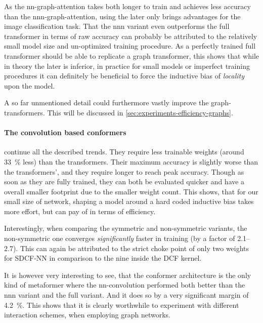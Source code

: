 As the nn-graph-attention takes both longer to train and achieves less accuracy than the nnn-graph-attention, using the later only brings advantages for the image classification task.
That the nnn variant even outperforms the full transformer in terms of raw accuracy can probably be attributed to the relatively small model size and un-optimized training procedure.
As a perfectly trained full transformer should be able to replicate a graph transformer, this shows that while in theory the later is inferior, in practice for small models or imperfect training procedures it can definitely be beneficial to force the inductive bias of \emph{locality} upon the model.

A so far unmentioned detail could furthermore vastly improve the graph-transformers. 
This will be discussed in \autoref{sec:experiments-efficiency-graphs}.

\paragraph{The convolution based conformers} continue all the described trends.
They require less trainable weights (around \SI[]{33}[]{\percent} less) than the transformers.
Their maximum accuracy is slightly worse than the transformers', and they require longer to reach peak accuracy.
Though as soon as they are fully trained, they can both be evaluated quicker and have a overall smaller footprint due to the smaller weight count.
This shows, that for our small size of network, shaping a model around a hard coded inductive bias takes more effort, but can pay of in terms of efficiency.

Interestingly, when comparing the symmetric and non-symmetric variants, the non-symmet\-ric one converges \emph{significantly} faster in training (by a factor of \SIrange[]{2.1}{2.7}{}). 
This can again be attributed to the strict choke point of only two weights for SDCF-NN in comparison to the nine inside the DCF kernel.

It is however very interesting to see, that the conformer architecture is the only kind of metaformer where the nn-convolution performed both better than the nnn variant and the full variant.
And it does so by a very significant margin of \SI[]{4.2}[]{\percent}.
This shows that it is clearly worthwhile to experiment with different interaction schemes, when employing graph networks.

